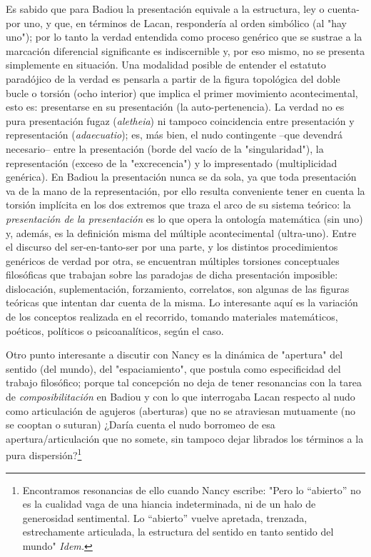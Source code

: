 Es sabido que para Badiou la presentación equivale a la estructura, ley
o cuenta-por uno, y que, en términos de Lacan, respondería al orden
simbólico (al "hay uno"); por lo tanto la verdad entendida como proceso
genérico que se sustrae a la marcación diferencial significante es
indiscernible y, por eso mismo, no se presenta simplemente en situación.
Una modalidad posible de entender el estatuto paradójico de la verdad es
pensarla a partir de la figura topológica del doble bucle o torsión
(ocho interior) que implica el primer movimiento acontecimental, esto
es: presentarse en su presentación (la auto-pertenencia). La verdad no
es pura presentación fugaz (\emph{aletheia}) ni tampoco coincidencia
entre presentación y representación (\emph{adaecuatio}); es, más bien,
el nudo contingente --que devendrá necesario-- entre la presentación
(borde del vacío de la "singularidad"), la representación (exceso de la
"excrecencia") y lo impresentado (multiplicidad genérica). En Badiou la
presentación nunca se da sola, ya que toda presentación va de la mano de
la representación, por ello resulta conveniente tener en cuenta la
torsión implícita en los dos extremos que traza el arco de su sistema
teórico: la \emph{presentación de la presentación} es lo que opera la
ontología matemática (sin uno) y, además, es la definición misma del
múltiple acontecimental (ultra-uno). Entre el discurso del
ser-en-tanto-ser por una parte, y los distintos procedimientos genéricos
de verdad por otra, se encuentran múltiples torsiones conceptuales
filosóficas que trabajan sobre las paradojas de dicha presentación
imposible: dislocación, suplementación, forzamiento, correlatos, son
algunas de las figuras teóricas que intentan dar cuenta de la misma. Lo
interesante aquí es la variación de los conceptos realizada en el
recorrido, tomando materiales matemáticos, poéticos, políticos o
psicoanalíticos, según el caso.

Otro punto interesante a discutir con Nancy es la dinámica de "apertura"
del sentido (del mundo), del "espaciamiento", que postula como
especificidad del trabajo filosófico; porque tal concepción no deja de
tener resonancias con la tarea de \emph{composibilitación} en Badiou y
con lo que interrogaba Lacan respecto al nudo como articulación de
agujeros (aberturas) que no se atraviesan mutuamente (no se cooptan o
suturan) ¿Daría cuenta el nudo borromeo de esa apertura/articulación que
no somete, sin tampoco dejar librados los términos a la pura
dispersión?\footnote{Encontramos resonancias de ello cuando Nancy
  escribe: "Pero lo ``abierto'' no es la cualidad vaga de una hiancia
  indeterminada, ni de un halo de generosidad sentimental. Lo
  ``abierto'' vuelve apretada, trenzada, estrechamente articulada, la
  estructura del sentido en tanto sentido del mundo" \emph{Idem.}}

